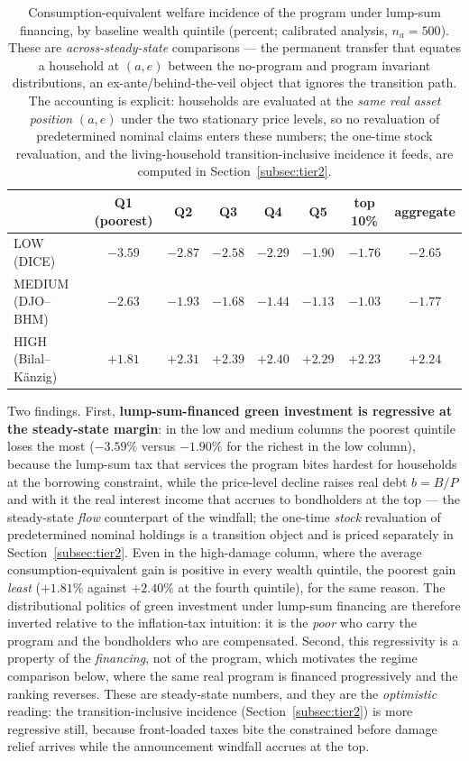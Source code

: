 \documentclass[12pt]{article}
\begin{document}
\begin{table}[!htb]
\centering
\caption{Consumption-equivalent welfare incidence of the program under
lump-sum financing, by baseline wealth quintile (percent;
calibrated analysis, $n_a=500$). These are \emph{across-steady-state}
comparisons --- the permanent transfer that equates a household at
$(a,e)$ between the no-program and program invariant distributions, an
ex-ante/behind-the-veil object that ignores the transition path. The
accounting is explicit: households are evaluated at the \emph{same real
asset position} $(a,e)$ under the two stationary price levels, so no
revaluation of predetermined nominal claims enters these numbers; the
one-time stock revaluation, and the living-household transition-inclusive
incidence it feeds, are computed in Section~\ref{subsec:tier2}.}
\label{tab:incidence}
\small
\setlength{\tabcolsep}{4.5pt}
\begin{tabular}{lccccccc}
\toprule
 & Q1 (poorest) & Q2 & Q3 & Q4 & Q5 & top 10\% & aggregate \\
\midrule
LOW (DICE)          & $-3.59$ & $-2.87$ & $-2.58$ & $-2.29$ & $-1.90$ & $-1.76$ & $-2.65$ \\
MEDIUM (DJO--BHM)   & $-2.63$ & $-1.93$ & $-1.68$ & $-1.44$ & $-1.13$ & $-1.03$ & $-1.77$ \\
HIGH (Bilal--K\"anzig) & $+1.81$ & $+2.31$ & $+2.39$ & $+2.40$ & $+2.29$ & $+2.23$ & $+2.24$ \\
\bottomrule
\end{tabular}
\end{table}

Two findings. First, \textbf{lump-sum-financed green investment is regressive
at the steady-state margin}: in the low and medium columns the poorest
quintile loses the most ($-3.59\%$ versus $-1.90\%$ for the richest in the
low column), because the lump-sum tax that services the program bites
hardest for households at the borrowing constraint, while the price-level
decline raises real debt $b=B/P$ and with it the real interest income that
accrues to bondholders at the top --- the steady-state \emph{flow}
counterpart of the windfall; the one-time \emph{stock} revaluation of
predetermined nominal holdings is a transition object and is priced
separately in Section~\ref{subsec:tier2}. Even in the
high-damage column, where the average consumption-equivalent gain is
positive in every wealth quintile, the poorest gain
\emph{least} ($+1.81\%$ against $+2.40\%$ at the fourth quintile), for the
same reason. The
distributional politics of green investment under lump-sum financing are
therefore inverted relative to the inflation-tax intuition: it is the
\emph{poor} who carry the program and the bondholders who are compensated.
Second, this regressivity is a property of the \emph{financing}, not of the
program, which motivates the regime comparison below, where the same real
program is financed progressively and the ranking reverses. These are
steady-state numbers, and they are the \emph{optimistic} reading: the
transition-inclusive incidence (Section~\ref{subsec:tier2}) is more
regressive still, because front-loaded taxes bite the constrained before
damage relief arrives while the announcement windfall accrues at the top.
\end{document}
